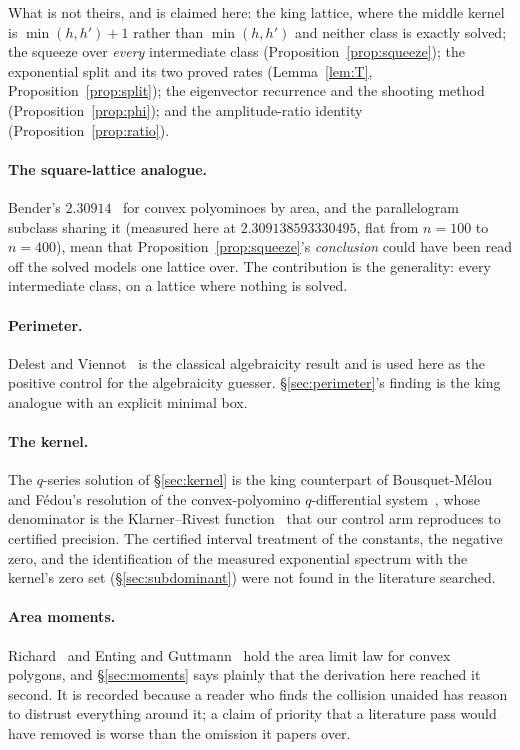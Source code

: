 \documentclass[11pt]{article}
\begin{document}
What is not theirs, and is claimed here: the king lattice, where the middle
kernel is $\min(h,h')+1$ rather than $\min(h,h')$ and neither class is exactly
solved; the squeeze over \emph{every} intermediate class
(Proposition~\ref{prop:squeeze}); the exponential split and its two proved rates
(Lemma~\ref{lem:T}, Proposition~\ref{prop:split}); the eigenvector recurrence
and the shooting method (Proposition~\ref{prop:phi}); and the amplitude-ratio
identity (Proposition~\ref{prop:ratio}).

\paragraph{The square-lattice analogue.} Bender's $2.30914$~\cite{bender1974} for
convex polyominoes by area, and the parallelogram subclass 
sharing it (measured here at $2.309138593330495$, flat from $n = 100$ to
$n = 400$), mean that Proposition~\ref{prop:squeeze}'s \emph{conclusion} could
have been read off the solved models one lattice over. The contribution is the
generality: every intermediate class, on a lattice where nothing is solved.

\paragraph{Perimeter.} Delest and Viennot~\cite{delestViennot1984} is the
classical algebraicity result and is used here as the positive control for the
algebraicity guesser. \S\ref{sec:perimeter}'s finding is the king analogue with
an explicit minimal box.

\paragraph{The kernel.} The $q$-series solution of \S\ref{sec:kernel} is the
king counterpart of Bousquet-M\'elou and F\'edou's resolution of the
convex-polyomino $q$-differential system~\cite{bousquetMelouFedou1995}, whose
denominator is the Klarner--Rivest function~\cite{klarnerRivest1973} that our
control arm reproduces to certified precision. The certified interval treatment
of the constants, the negative zero, and the identification of the measured
exponential spectrum with the kernel's zero set (\S\ref{sec:subdominant})
were not found in the literature searched.

\paragraph{Area moments.} Richard~\cite{richard2007} and Enting and
Guttmann~\cite{entingGuttmann1989} hold the area limit law for convex polygons,
and \S\ref{sec:moments} says plainly that the derivation here reached it second.
It is recorded because a reader who finds the collision unaided has reason to
distrust everything around it; a claim of priority that a literature pass would
have removed is worse than the omission it papers over.
\end{document}

